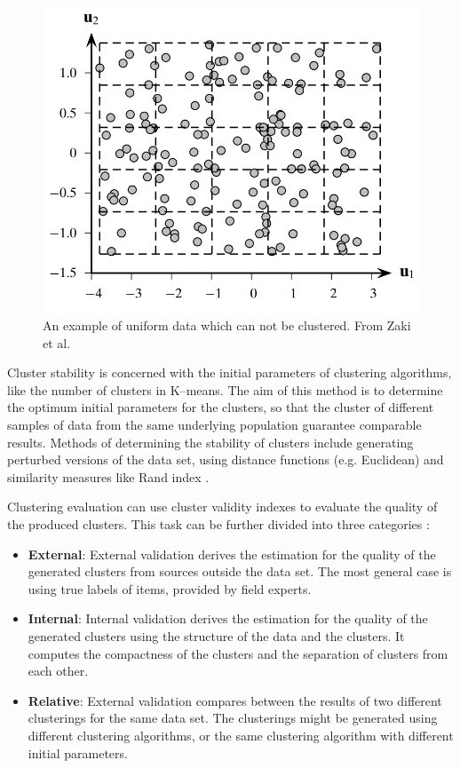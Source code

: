 \begin{figure}[!h]
    \includegraphics[scale=0.33]{images/chapter2/uniformData.png}
    \caption{An example of uniform data which can not be clustered. From Zaki et al.\cite{Zaki2014}}
    \label{fig:uniformData}
\end{figure}

Cluster stability is concerned with the initial parameters of clustering algorithms, like the number of clusters in K--means. The aim of this method is to determine the optimum initial parameters for the clusters, so that the cluster of different samples of data from the same underlying population guarantee comparable results. Methods of determining the stability of clusters include generating perturbed versions of the data set, using distance functions (e.g. Euclidean) and similarity measures like Rand index \cite{VonLuxburg2010}.

Clustering evaluation can use cluster validity indexes to evaluate the quality of the produced clusters. This task can be further divided into three categories \cite{Halkidi2002a, Halkidi2002, Zaki2014}:

\begin{itemize}
    
    \item \textbf{External}: External validation derives the estimation for the quality of the generated clusters from sources outside the data set. The most general case is using true labels of items, provided by field experts.
    
    \item \textbf{Internal}: Internal validation derives the estimation for the quality of the generated clusters using the structure of the data and the clusters. It computes the compactness of the clusters and the separation of clusters from each other.
    
    \item \textbf{Relative}: External validation compares between the results of two different clusterings for the same data set. The clusterings might be generated using different clustering algorithms, or the same clustering algorithm with different initial parameters.
    
\end{itemize}

